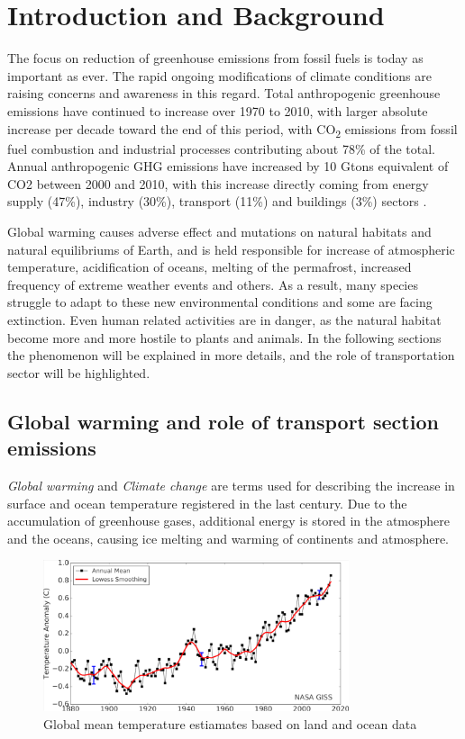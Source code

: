 \chapter{Introduction and Background}

The focus on reduction of greenhouse emissions from fossil fuels is today as important as ever. The rapid ongoing modifications of climate conditions are raising concerns and awareness in this regard. Total anthropogenic greenhouse emissions have continued to increase over 1970 to 2010, with larger absolute increase per decade toward the end of this period, with CO\textsubscript{2} emissions from fossil fuel combustion and industrial processes contributing about 78\% of the total. Annual anthropogenic GHG emissions have increased by 10 Gtons equivalent of CO2 between 2000 and 2010, with this increase directly coming from energy supply (47\%), industry (30\%), transport (11\%) and buildings (3\%) sectors \cite{IPCC2014}.

Global warming causes adverse effect and mutations on natural habitats and natural equilibriums of Earth, and is held responsible for increase of atmospheric temperature, acidification of oceans, melting of the permafrost, increased frequency of extreme weather events and others. As a result, many species struggle to adapt to these new environmental conditions and some are facing extinction. Even human related activities are in danger, as the natural habitat become more and more hostile to plants and animals. In the following sections the phenomenon will be explained in more details, and the role of transportation sector will be highlighted.

\section{Global warming and role of transport section emissions} \label{sec:global_warming}

\emph{Global warming} and \emph{Climate change} are terms used for describing the increase in surface and ocean temperature registered in the last century. Due to the accumulation of greenhouse gases, additional energy is stored in the atmosphere and the oceans, causing ice melting and warming of continents and atmosphere. 

\begin{figure}[h]
  \centering
  \includegraphics[width=0.8\textwidth]{figures/introduction/temp_rise.pdf}
  \caption{Global mean temperature estiamates based on land and ocean data\cite{GISS2016}}
  \label{antropogenic_ghg_emissions}
\end{figure}

